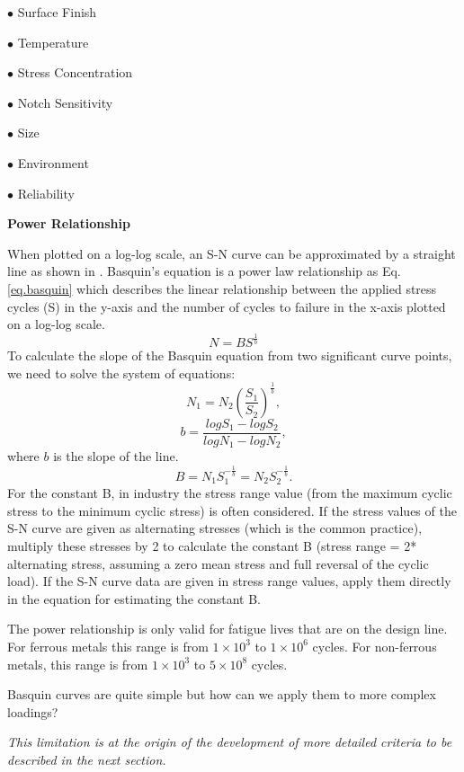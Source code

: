 \vspace{6pt}
$\bullet$ Surface Finish

$\bullet$ Temperature

$\bullet$ Stress Concentration

$\bullet$ Notch Sensitivity

$\bullet$ Size

$\bullet$ Environment

$\bullet$ Reliability
\vspace{6pt}         

\textbf{Power Relationship}   

When plotted on a log-log scale, an S-N curve can be approximated by a straight line as shown
in . Basquin’s equation is a power law relationship as  Eq.\ref{eq.basquin} which describes the linear relationship between the applied stress cycles (S) in the y-axis and the number of cycles to failure in the x-axis plotted on a log-log scale.
\begin{equation}
N=BS^\frac{1}{b}
\label{eq.basquin}
\end{equation}
To calculate the slope of the Basquin equation from two significant curve points, we need to solve the system of equations:
$$N_1=N_2\left(\dfrac{S_1}{S_2}\right)^\frac{1}{b},$$
$$b=\dfrac{logS_1-logS_2}{logN_1-logN_2},$$
where $b$ is the slope of the line.
$$B=N_1S_1^{-\frac{1}{b}}=N_2S_2^{-\frac{1}{b}}.$$
For the constant B, in industry  the stress range value (from the maximum cyclic stress to the minimum cyclic stress) is often considered. If the stress values of the S-N curve are given as alternating stresses (which is the common practice), multiply these stresses by 2 to calculate the constant B (stress range = 2* alternating stress, assuming a zero mean stress and full reversal of the cyclic load). If the S-N curve data are given in stress range values, apply them directly in the equation for estimating the constant B. 

The power relationship is only valid for fatigue lives that are on the design line. For ferrous metals this range is from $1\times10^3$ to $1\times10^6$ cycles. For non-ferrous metals, this range is from
$1\times10^3$ to $5\times10^8$ cycles. 

Basquin curves are quite simple but how can we apply them to more complex loadings?

\textit{This limitation is at the origin of the development of more detailed criteria to be described in the next section.}

